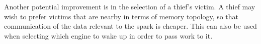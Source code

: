 Another potential improvement is in the selection of a thief's victim.
A thief may wish to prefer victims that are nearby in terms of memory
topology, so that communication of the data relevant to the spark is
cheaper.
This can also be used when selecting which engine to wake up in order to
pass work to it.

